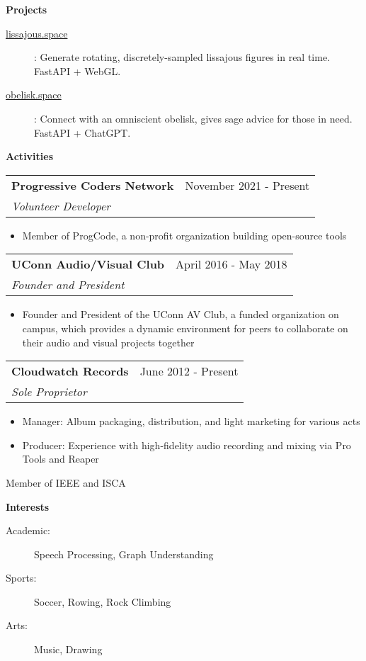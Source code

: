 \documentclass[letterpaper,11pt]{article}
\makeatletter
\newcommand{\resitem}[1]{\item #1 \vspace{-2pt}}
\newcommand{\resheading}[1]{{\large \colorbox{mygrey}{\begin{minipage}{\textwidth}{\textbf{#1 \vphantom{p\^{E}}}}\end{minipage}}}}
\newcommand{\ressubheading}[4]{
\begin{tabular*}{6.9in}{l@{\extracolsep{\fill}}r}
		\textbf{#1} & #2 \\
		\textit{#3} & \textit{#4} \\
\end{tabular*}\vspace{-6pt}}
\makeatother
\begin{document}
\resheading{Projects}
\begin{description}
    \item[\href{https://lissajous.space}{lissajous.space}]: Generate rotating, discretely-sampled lissajous figures in real time. FastAPI + WebGL.
    \item[\href{https://obelisk.space}{obelisk.space}]: Connect with an omniscient obelisk, gives sage advice for those in need. FastAPI + ChatGPT.
\end{description}


\resheading{Activities}
\begin{description}
\item
    \ressubheading{Progressive Coders Network}{November 2021 - Present}{Volunteer Developer}{}
    \begin{itemize}
        \resitem{Member of ProgCode, a non-profit organization building open-source tools}
    \end{itemize}
\item
    \ressubheading{UConn Audio/Visual Club}{April 2016 - May 2018}{Founder and President}{}
    \begin{itemize}
        \resitem{Founder and President of the UConn AV Club, a funded organization on campus, which provides a dynamic environment for peers to collaborate on their audio and visual projects together}
    \end{itemize}
\item
    \ressubheading{Cloudwatch Records}{June 2012 - Present}{Sole Proprietor}{}
    \begin{itemize}
        \resitem{Manager: Album packaging, distribution, and light marketing for various acts}
        \resitem{Producer: Experience with high-fidelity audio recording and mixing via Pro Tools and Reaper}
    \end{itemize}
\item
    Member of IEEE and ISCA
\end{description}


\resheading{Interests}

\begin{description}
\item[Academic:] Speech Processing, Graph Understanding
\item[Sports:] Soccer, Rowing, Rock Climbing
\item[Arts:] Music, Drawing
\end{description}
\end{document}
